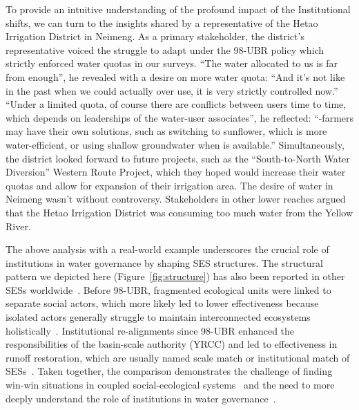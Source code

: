 To provide an intuitive understanding of the profound impact of the Institutional shifts, we can turn to the insights shared by a representative of the Hetao Irrigation District in Neimeng.
As a primary stakeholder, the district's representative voiced the struggle to adapt under the 98-UBR policy which strictly enforced water quotas in our surveys.
``The water allocated to us is far from enough'', he revealed with a desire on more water quota: ``And it's not like in the past when we could actually over use, it is very strictly controlled now.''
``Under a limited quota, of course there are conflicts between users time to time, which depends on leaderships of the water-user associates'', he reflected: ``-farmers may have their own solutions, such as switching to sunflower, which is more water-efficient, or using shallow groundwater when is available.''
Simultaneously, the district looked forward to future projects, such as the ``South-to-North Water Diversion'' Western Route Project, which they hoped would increase their water quotas and allow for expansion of their irrigation area.
The desire of water in Neimeng wasn't without controversy. Stakeholders in other lower reaches argued that the Hetao Irrigation District was consuming too much water from the Yellow River.

The above analysis with a real-world example underscores the crucial role of institutions in water governance by shaping SES structures.
The structural pattern we depicted here (Figure~\ref{fig:structure}) has also been reported in other SESs worldwide~\cite{kluger2020,guerrero2015,bodin2012}.
Before 98-UBR, fragmented ecological units were linked to separate social actors, which more likely led to lower effectiveness because isolated actors generally struggle to maintain interconnected ecosystems holistically~\cite{sayles2017,sayles2019,cai2016,bergsten2019}.
Institutional re-alignments since 98-UBR enhanced the responsibilities of the basin-scale authority (YRCC) and led to effectiveness in runoff restoration, which are usually named scale match or institutional match of SESs~\cite{cumming2020a,wang2019d}.
Taken together, the comparison demonstrates the challenge of finding win-win situations in coupled social-ecological systems~\cite{hegwood2022} and the need to more deeply understand the role of institutions in water governance~\cite{bergsten2019, sayles2019}.

